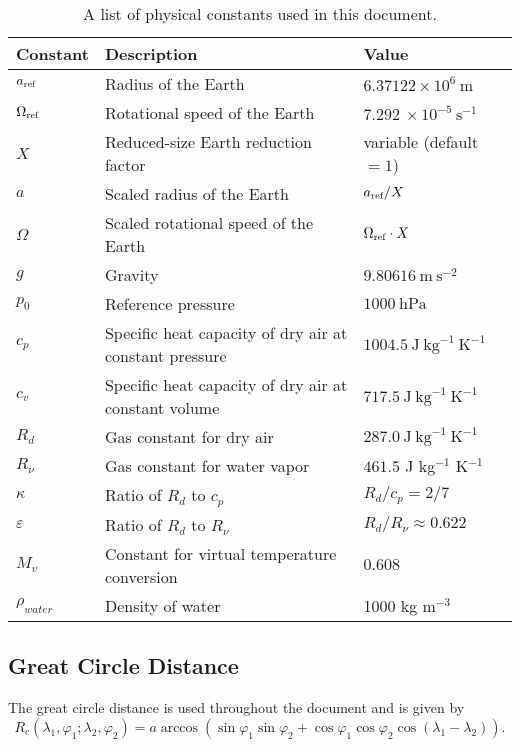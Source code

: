 \documentclass[times,doublespace]{fldauth}
\begin{document}
\begin{table}[h]
\caption{A list of physical constants used in this document.} \label{tab:PhysicalConstants}
\begin{tabular*}{\textwidth}{@{\extracolsep{\fill}}lll}
\hline Constant & Description & Value \\
\hline $a_{\tiny \mbox{ref}}$ & Radius of the Earth & $6.37122 \times 10^{6}\ \mbox{m}$ \\
$\Omega_{\tiny \mbox{ref}}$ & Rotational speed of the Earth & $7.292\ \times 10^{-5}\ \mbox{s}^{-1}$ \\
$X$ & Reduced-size Earth reduction factor & variable (default $= 1$) \\
$a$ & Scaled radius of the Earth & $a_{\tiny \mbox{ref}} / X$ \\
$\Omega$ & Scaled rotational speed of the Earth & $\Omega_{\tiny \mbox{ref}} \cdot X$ \\
$g$ & Gravity & $9.80616\ \mbox{m}\ \mbox{s}^{-2}$ \\
$p_0$ & Reference pressure & $1000\ \mbox{hPa}$ \\
$c_p$ & Specific heat capacity of dry air at constant pressure & $1004.5\ \mbox{J}\ \mbox{kg}^{-1}\ \mbox{K}^{-1}$ \\
$c_v$ & Specific heat capacity of dry air at constant volume & $717.5\ \mbox{J}\ \mbox{kg}^{-1}\ \mbox{K}^{-1}$ \\
$R_d$ & Gas constant for dry air & $287.0\ \mbox{J}\ \mbox{kg}^{-1}\ \mbox{K}^{-1}$ \\
$R_\nu$ & Gas constant for water vapor & $461.5$ J kg$^{-1}$ K$^{-1}$ \\
$\kappa$ & Ratio of $R_d$ to $c_p$ & $R_d/c_p = 2/7$ \\
$\varepsilon$ & Ratio of $R_d$ to $R_\nu$ & $R_d/R_\nu \approx 0.622$ \\
$M_v$ & Constant for virtual temperature conversion & $0.608$ \\
$\rho_{water}$ & Density of water & 1000 kg m$^{-3}$ \\
\hline 
\end{tabular*}

\end{table}

\subsection{Great Circle Distance}

The great circle distance is used throughout the document and is given by
\begin{equation}
R_c(\lambda_1, \varphi_1; \lambda_2, \varphi_2) = a \arccos \left( \sin \varphi_1 \sin \varphi_2 + \cos \varphi_1 \cos \varphi_2 \cos (\lambda_1 - \lambda_2) \right).
\end{equation}
\end{document}
